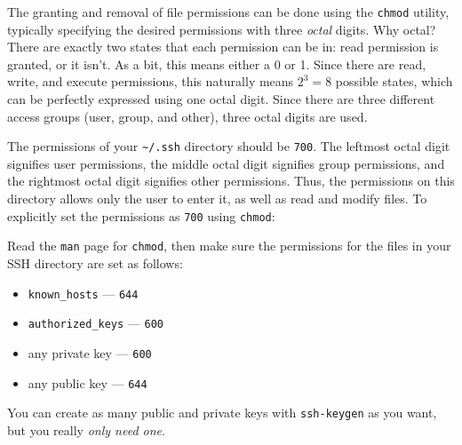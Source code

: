 The granting and removal of file permissions can be done using the
\texttt{chmod} utility, typically specifying the desired permissions
with three \emph{octal} digits. Why octal? There are exactly two states that
each permission can be in: read permission is granted, or it isn't. As a
bit, this means either a 0 or 1. Since there are read, write, and
execute permissions, this naturally means $2^3 = 8$ possible states,
which can be perfectly expressed using one octal digit. Since there are
three different access groups (user, group, and other), three octal
digits are used.

The permissions of your \texttt{\textasciitilde/.ssh} directory should
be \texttt{700}. The leftmost octal digit signifies user permissions,
the middle octal digit signifies group permissions, and the rightmost
octal digit signifies other permissions. Thus, the permissions on this
directory allows only the user to enter it, as well as read and modify
files. To explicitly set the permissions as \texttt{700} using
\texttt{chmod}:


Read the \texttt{man} page for \texttt{chmod}, then make sure the
permissions for the files in your SSH directory are set as follows:
\begin{itemize}
  \item \texttt{known\_hosts} --- \texttt{644}
  \item \texttt{authorized\_keys} --- \texttt{600}
  \item any private key --- \texttt{600}
  \item any public key --- \texttt{644}
\end{itemize}

You can create as many public and private keys with \texttt{ssh-keygen}
as you want, but you really \emph{only need one}.

